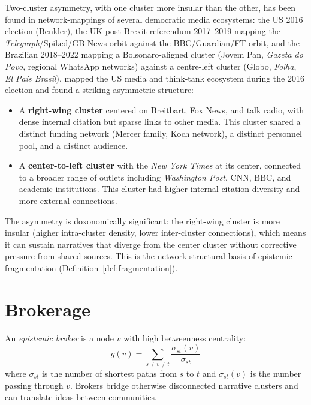\begin{example}
\label{ex:two-cluster}
Two-cluster asymmetry, with one cluster more insular than the other, has been found in network-mappings of several democratic media ecosystems: the US 2016 election (Benkler), the UK post-Brexit referendum 2017--2019 mapping the \textit{Telegraph}/Spiked/GB News orbit against the BBC/Guardian/FT orbit, and the Brazilian 2018--2022 mapping a Bolsonaro-aligned cluster (Jovem Pan, \textit{Gazeta do Povo}, regional WhatsApp networks) against a centre-left cluster (Globo, \textit{Folha}, \textit{El País Brasil}).
\textcite{benkler2018} mapped the US media and think-tank ecosystem during the 2016 election and found a striking asymmetric structure:
\begin{itemize}[nosep]
  \item A \textbf{right-wing cluster} centered on Breitbart, Fox News, and talk radio, with dense internal citation but sparse links to other media.
  This cluster shared a distinct funding network (Mercer family, Koch network), a distinct personnel pool, and a distinct audience.
  \item A \textbf{center-to-left cluster} with the \textit{New York Times} at its center, connected to a broader range of outlets including \textit{Washington Post}, CNN, BBC, and academic institutions.
  This cluster had higher internal citation diversity and more external connections.
\end{itemize}
The asymmetry is doxonomically significant: the right-wing cluster is more insular (higher intra-cluster density, lower inter-cluster connections), which means it can sustain narratives that diverge from the center cluster without corrective pressure from shared sources.
This is the network-structural basis of epistemic fragmentation (Definition~\ref{def:fragmentation}).
\end{example}


\section{Brokerage}
\label{sec:ch15-brokerage}

\begin{definition}
\label{def:broker}
An \emph{epistemic broker} is a node $v$ with high betweenness centrality:
\[
  g(v) = \sum_{s \neq v \neq t} \frac{\sigma_{st}(v)}{\sigma_{st}}
\]
where $\sigma_{st}$ is the number of shortest paths from $s$ to $t$ and $\sigma_{st}(v)$ is the number passing through $v$.
Brokers bridge otherwise disconnected narrative clusters and can translate ideas between communities.
\end{definition}

